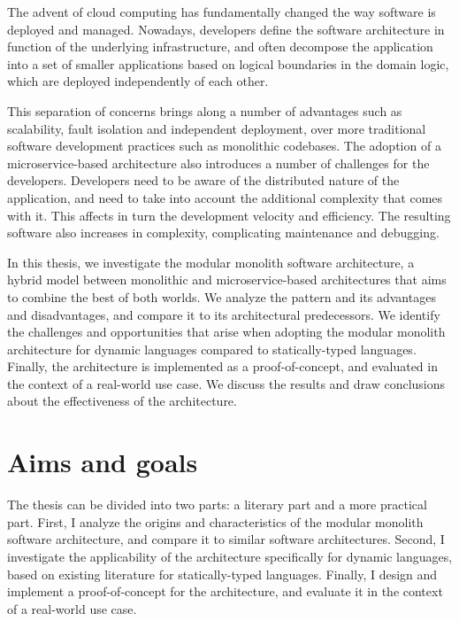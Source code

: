 \documentclass[12pt]{article}
\begin{document}
	The advent of cloud computing has fundamentally changed the way software is deployed and managed.
	Nowadays, developers define the software architecture in function of the underlying infrastructure, and often decompose the application into a set of smaller applications based on logical boundaries in the domain logic, which are deployed independently of each other.

	This separation of concerns brings along a number of advantages such as scalability, fault isolation and independent deployment, over more traditional software development practices such as monolithic codebases.
	The adoption of a microservice-based architecture also introduces a number of challenges for the developers.
	Developers need to be aware of the distributed nature of the application, and need to take into account the additional complexity that comes with it.
	This affects in turn the development velocity and efficiency.
	The resulting software also increases in complexity, complicating maintenance and debugging.

	In this thesis, we investigate the modular monolith software architecture, a hybrid model between monolithic and microservice-based architectures that aims to combine the best of both worlds.
	We analyze the pattern and its advantages and disadvantages, and compare it to its architectural predecessors.
	We identify the challenges and opportunities that arise when adopting the modular monolith architecture for dynamic languages compared to statically-typed languages.
	Finally, the architecture is implemented as a proof-of-concept, and evaluated in the context of a real-world use case.
	We discuss the results and draw conclusions about the effectiveness of the architecture.

	\clearpage

	\section{Aims and goals}\label{sec:aims-and-goals}

	The thesis can be divided into two parts: a literary part and a more practical part.
	First, I analyze the origins and characteristics of the modular monolith software architecture, and compare it to similar software architectures.
	Second, I investigate the applicability of the architecture specifically for dynamic languages, based on existing literature for statically-typed languages.
	Finally, I design and implement a proof-of-concept for the architecture, and evaluate it in the context of a real-world use case.
\end{document}
